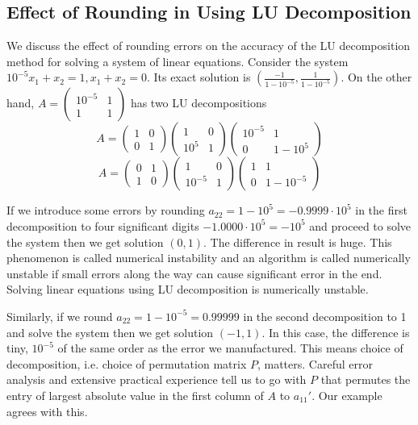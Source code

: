 \documentclass[12pt]{amsart}
\theoremstyle{definition}
\begin{document}
\subsection{Effect of Rounding in Using LU Decomposition} We discuss the effect of rounding errors on the accuracy of the LU decomposition method for solving a system of linear equations. Consider the system $10^{-5}x_1 + x_2 = 1, x_1 + x_2 = 0$. Its exact solution is $(\frac{-1}{1 - 10^{-5}}, \frac{1}{1 - 10^{-5}})$. On the other hand, $A = \left(\begin{array}{cc} 10^{-5} & 1 \\ 1 & 1 \end{array}\right)$ has two LU decompositions
$$A = \left(\begin{array}{cc} 1 & 0 \\ 0 & 1 \end{array}\right)\left(\begin{array}{cc} 1 & 0 \\ 10^5 & 1 \end{array}\right)\left(\begin{array}{cc} 10^{-5} & 1 \\ 0 & 1 - 10^5 \end{array}\right)$$
$$A = \left(\begin{array}{cc} 0 & 1 \\ 1 & 0 \end{array}\right)\left(\begin{array}{cc} 1 & 0 \\ 10^{-5} & 1 \end{array}\right)\left(\begin{array}{cc} 1 & 1 \\ 0 & 1 - 10^{-5} \end{array}\right)$$

If we introduce some errors by rounding $a_{22} = 1 - 10^5 = -0.9999 \cdot 10^5$ in the first decomposition to four significant digits $-1.0000 \cdot 10^5 = -10^5$ and proceed to solve the system then we get solution $(0,1)$. The difference in result is huge. This phenomenon is called numerical instability and an algorithm is called numerically unstable if small errors along the way can cause significant error in the end. Solving linear equations using LU decomposition is numerically unstable.

Similarly, if we round $a_{22} = 1 - 10^{-5} = 0.99999$ in the second decomposition to 1 and solve the system then we get solution $(-1,1)$. In this case, the difference is tiny, $10^{-5}$ of the same order as the error we manufactured. This means choice of decomposition, i.e. choice of permutation matrix $P$, matters. Careful error analysis and extensive practical experience tell us to go with $P$ that permutes the entry of largest absolute value in the first column of $A$ to $a_{11}'$. Our example agrees with this.
\end{document}
